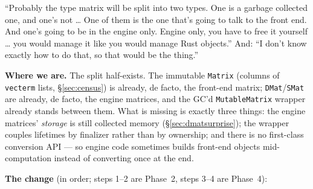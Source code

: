 \documentclass[11pt,oneside]{report}
\newcommand{\code}[1]{\textcolor{m2code}{\texttt{#1}}}
\begin{document}
\begin{mikesays}[on matrices]
``Probably the type matrix will be split into two types. One is a garbage
collected one, and one's not \ldots{} One of them is the one that's going
to talk to the front end. And one's going to be in the engine only. Engine
only, you have to free it yourself \ldots{} you would manage it like you
would manage Rust objects.'' And: ``I don't know exactly how to do that,
so that would be the thing.''
\end{mikesays}

\textbf{Where we are.} The split half-exists. The immutable \code{Matrix}
(columns of \code{vecterm} lists, \S\ref{sec:census}) is already, de facto,
the front-end matrix; \code{DMat}/\code{SMat} are already, de facto, the
engine matrices, and the GC'd \code{MutableMatrix} wrapper already stands
between them. What is missing is exactly three things: the engine matrices'
\emph{storage} is still collected memory (\S\ref{sec:dmatsurprise}); the
wrapper couples lifetimes by finalizer rather than by ownership; and there
is no first-class conversion API --- so engine code sometimes builds
front-end objects mid-computation instead of converting once at the end.

\textbf{The change} (in order; steps 1--2 are Phase~2, steps 3--4 are
Phase~4):
\end{document}
